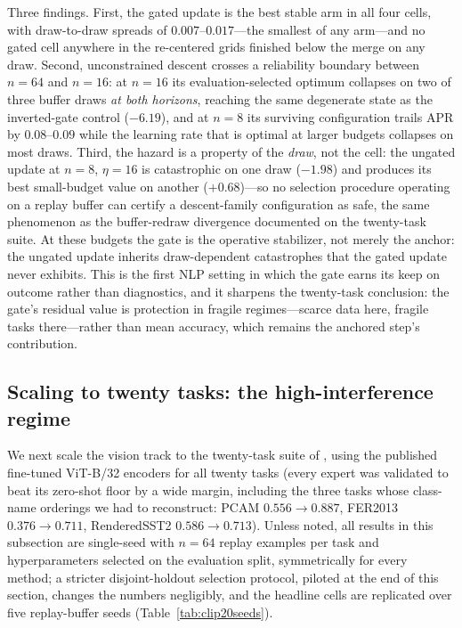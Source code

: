 \documentclass[11pt]{article}
\begin{document}
Three findings. First, the gated update is the best stable arm in all four cells, with draw-to-draw spreads of $0.007$--$0.017$---the smallest of any arm---and no gated cell anywhere in the re-centered grids finished below the merge on any draw. Second, unconstrained descent crosses a reliability boundary between $n=64$ and $n=16$: at $n=16$ its evaluation-selected optimum collapses on two of three buffer draws \emph{at both horizons}, reaching the same degenerate state as the inverted-gate control ($-6.19$), and at $n=8$ its surviving configuration trails APR by $0.08$--$0.09$ while the learning rate that is optimal at larger budgets collapses on most draws. Third, the hazard is a property of the \emph{draw}, not the cell: the ungated update at $n=8$, $\eta=16$ is catastrophic on one draw ($-1.98$) and produces its best small-budget value on another ($+0.68$)---so no selection procedure operating on a replay buffer can certify a descent-family configuration as safe, the same phenomenon as the buffer-redraw divergence documented on the twenty-task suite. At these budgets the gate is the operative stabilizer, not merely the anchor: the ungated update inherits draw-dependent catastrophes that the gated update never exhibits. This is the first NLP setting in which the gate earns its keep on outcome rather than diagnostics, and it sharpens the twenty-task conclusion: the gate's residual value is protection in fragile regimes---scarce data here, fragile tasks there---rather than mean accuracy, which remains the anchored step's contribution.

\subsection{Scaling to twenty tasks: the high-interference regime}
\label{sec:clip20}

We next scale the vision track to the twenty-task suite of \citet{wang2024tall}, using the published fine-tuned ViT-B/32 encoders for all twenty tasks (every expert was validated to beat its zero-shot floor by a wide margin, including the three tasks whose class-name orderings we had to reconstruct: PCAM $0.556\!\to\!0.887$, FER2013 $0.376\!\to\!0.711$, RenderedSST2 $0.586\!\to\!0.713$). Unless noted, all results in this subsection are single-seed with $n=64$ replay examples per task and hyperparameters selected on the evaluation split, symmetrically for every method; a stricter disjoint-holdout selection protocol, piloted at the end of this section, changes the numbers negligibly, and the headline cells are replicated over five replay-buffer seeds (Table~\ref{tab:clip20seeds}).
\end{document}
